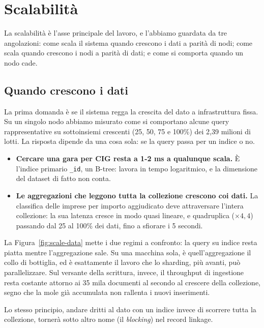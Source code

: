 \documentclass[11pt,a4paper]{article}
\begin{document}
\section{Scalabilità}

La scalabilità è l'asse principale del lavoro, e l'abbiamo guardata da tre angolazioni: come
scala il sistema quando crescono i dati a parità di nodi; come scala quando crescono i nodi a
parità di dati; e come si comporta quando un nodo cade.

\subsection{Quando crescono i dati}

La prima domanda è se il sistema regga la crescita del dato a infrastruttura fissa. Su un
singolo nodo abbiamo misurato come si comportano alcune query rappresentative su sottoinsiemi
crescenti (25, 50, 75 e 100\%) dei 2,39 milioni di lotti. La risposta dipende da
una cosa sola: se la query passa per un indice o no.

\begin{itemize}
  \item \textbf{Cercare una gara per CIG resta a 1-2 ms a qualunque scala.} È l'indice
        primario \texttt{\_id}, un B-tree: lavora in tempo logaritmico, e la dimensione del
        dataset di fatto non conta.
  \item \textbf{Le aggregazioni che leggono tutta la collezione crescono coi dati.} La
        classifica delle imprese per importo aggiudicato deve attraversare l'intera
        collezione: la sua latenza cresce in modo quasi lineare, e quadruplica
        ($\times 4{,}4$) passando dal 25 al 100\% dei dati, fino a sfiorare i 5 secondi.
\end{itemize}

\noindent
La Figura~\ref{fig:scale-data} mette i due regimi a confronto: la query su indice resta
piatta mentre l'aggregazione sale. Su una macchina sola, è quell'aggregazione il
collo di bottiglia, ed è esattamente il lavoro che lo sharding, più avanti, può
parallelizzare. Sul versante della scrittura, invece, il throughput di
ingestione resta costante attorno ai 35 mila documenti al secondo al crescere della collezione,
segno che la mole già accumulata non rallenta i nuovi inserimenti.

Lo stesso principio, andare dritti al dato con un indice invece di scorrere tutta la
collezione, tornerà sotto altro nome (il \emph{blocking}) nel record linkage.
\end{document}
